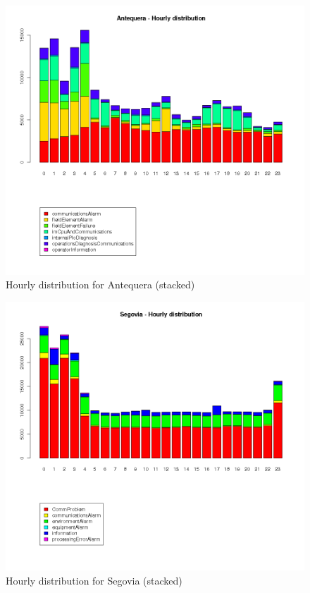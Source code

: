\documentclass[a4paper,12pt]{article}
\begin{document}
\begin{figure}[htb]
 \centering
 \includegraphics[width=\textwidth]{./img/antequera_timeline.png}
 \caption{Hourly distribution for Antequera (stacked)} \label{fig:antequera_timeline}
\end{figure}
\begin{figure}[htb]
 \centering
 \includegraphics[width=\textwidth]{./img/segovia_timeline.png}
 \caption{Hourly distribution for Segovia (stacked)} \label{fig:segovia_timeline}
\end{figure}
\end{document}
